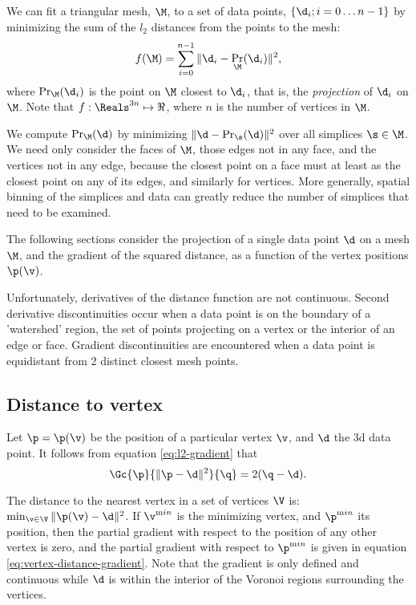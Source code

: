 \label{sec:data-fitting}

We can fit a triangular mesh, $\M$, to a set of data points, $\{\d_i; i=0 \ldots n-1\}$
by minimizing the sum of the $l_2$ distances from the points to the mesh:
\begin{equation}
f(\M) = \sum_{i=0}^{n-1} \| \d_i - \Pr_\M (\d_i) \|^2 ,
\end{equation}
where $\Pr_\M (\d_i)$ is the point on $\M$ closest to $\d_i$,
that is, the {\em projection} of $\d_i$ on $\M$.
Note that $f:\Reals^{3n} \mapsto \Re$,
where $n$ is the number of vertices in $\M$.

We compute $\Pr_\M (\d)$ by minimizing  $\| \d - \Pr_\s (\d) \|^2$
over all simplices $\s \in \M$.
We need only consider the faces of $\M$,
those edges not in any face,
and the vertices not in any edge,
because the closest point on a face must at least
as the closest point on any of its edges,
and similarly for vertices.
More generally, spatial binning of the simplices and data can greatly
reduce the number of simplices that need to be examined.

The following sections consider the projection of a single
data point $\d$ on a mesh $\M$,
and the gradient of the squared distance,
as a function of the vertex positions $\p(\v)$.

Unfortunately, derivatives of the distance function are not continuous.
Second derivative discontinuities occur
when a data point is on the boundary
of a 'watershed' region, the set of points
projecting on a vertex or the interior of an edge or face.
Gradient discontinuities are encountered
when a data point is equidistant from 2 distinct closest mesh points.

\subsection{Distance to vertex}
\label{sec:Distance-to-vertex}

Let $\p = \p(\v)$ be the position of a particular vertex $\v$,
and $\d$ the 3d data point.
It follows from equation \ref{eq:l2-gradient} that
\begin{equation}
\label{eq:vertex-distance-gradient}
\Gc{\p}{\| \p - \d \|^2}{\q} = 2 ( \q - \d ).
\end{equation}

The distance to the nearest vertex in a set of vertices $\V$ is:
$\min_{\v \in \V} \| \p(\v) - \d \|^2$.
If $\v^{\mathrm min}$ is the minimizing vertex,
and
$\p^{\mathrm min}$ its position,
then the partial gradient with respect
to the position of any other vertex is zero,
and the partial gradient with respect to $\p^{\mathrm min}$
is given in equation \ref{eq:vertex-distance-gradient}.
Note that the gradient is only defined and continuous
while $\d$ is within the interior of the
Voronoi regions surrounding the vertices.

